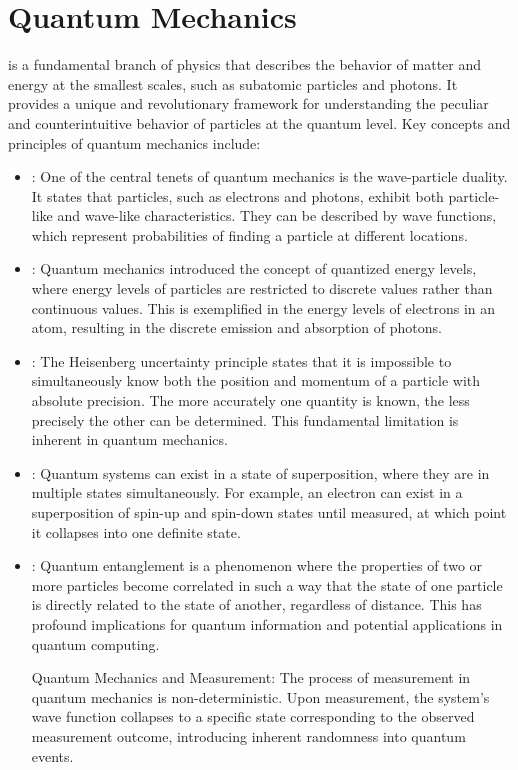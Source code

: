\chapter{Quantum Mechanics}
\thispagestyle{fancy}

 is a fundamental branch of physics that describes the behavior of matter and energy at the smallest scales, such as subatomic particles and photons. It provides a unique and revolutionary framework for understanding the peculiar and counterintuitive behavior of particles at the quantum level. Key concepts and principles of quantum mechanics include:

\begin{itemize}
	\item {}: One of the central tenets of quantum mechanics is the wave-particle duality. It states that particles, such as electrons and photons, exhibit both particle-like and wave-like characteristics. They can be described by wave functions, which represent probabilities of finding a particle at different locations.

	\item {}: Quantum mechanics introduced the concept of quantized energy levels, where energy levels of particles are restricted to discrete values rather than continuous values. This is exemplified in the energy levels of electrons in an atom, resulting in the discrete emission and absorption of photons.

	\item {}: The Heisenberg uncertainty principle states that it is impossible to simultaneously know both the position and momentum of a particle with absolute precision. The more accurately one quantity is known, the less precisely the other can be determined. This fundamental limitation is inherent in quantum mechanics.

	\item {}: Quantum systems can exist in a state of superposition, where they are in multiple states simultaneously. For example, an electron can exist in a superposition of spin-up and spin-down states until measured, at which point it collapses into one definite state.

	\item {}: Quantum entanglement is a phenomenon where the properties of two or more particles become correlated in such a way that the state of one particle is directly related to the state of another, regardless of distance. This has profound implications for quantum information and potential applications in quantum computing.

	Quantum Mechanics and Measurement: The process of measurement in quantum mechanics is non-deterministic. Upon measurement, the system's wave function collapses to a specific state corresponding to the observed measurement outcome, introducing inherent randomness into quantum events.

\end{itemize}
